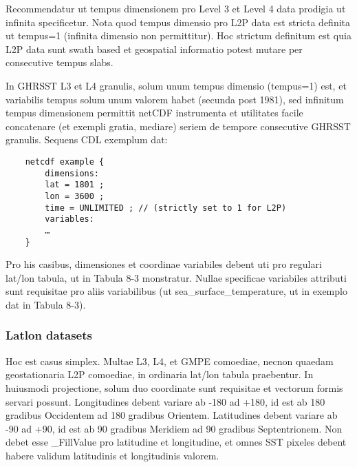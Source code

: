 Recommendatur ut tempus dimensionem pro Level 3 et Level 4 data prodigia ut infinita specificetur. Nota quod tempus dimensio pro L2P data est stricta definita ut tempus=1 (infinita dimensio non permittitur). Hoc strictum definitum est quia L2P data sunt swath based et geospatial informatio potest mutare per consecutive tempus slabs.
\par \vspace{0.1in}
In GHRSST L3 et L4 granulis, solum unum tempus dimensio (tempus=1) est, et variabilis tempus solum unum valorem habet (secunda post 1981), sed infinitum tempus dimensionem permittit netCDF instrumenta et utilitates facile concatenare (et exempli gratia, mediare) seriem de tempore consecutive GHRSST granulis. Sequens CDL exemplum dat:
\par \vspace{0.1in}

\begin{verbatim}
    netcdf example {
        dimensions:
        lat = 1801 ;
        lon = 3600 ;
        time = UNLIMITED ; // (strictly set to 1 for L2P)
        variables:
        …
    }
\end{verbatim}
\par \vspace{0.1in}
Pro his casibus, dimensiones et coordinae variabiles debent uti pro regulari lat/lon tabula, ut in Tabula 8-3 monstratur. Nullae specificae variabiles attributi sunt requisitae pro aliis variabilibus (ut sea\_surface\_temperature, ut in exemplo dat in Tabula 8-3).
\par \vspace{0.1in}



\subsubsection{Latlon datasets}
Hoc est casus simplex. Multae L3, L4, et GMPE comoediae, necnon quaedam geostationaria L2P comoediae, in ordinaria lat/lon tabula praebentur. In huiusmodi projectione, solum duo coordinate sunt requisitae et vectorum formis servari possunt. Longitudines debent variare ab -180 ad +180, id est ab 180 gradibus Occidentem ad 180 gradibus Orientem. Latitudines debent variare ab -90 ad +90, id est ab 90 gradibus Meridiem ad 90 gradibus Septentrionem. Non debet esse \_FillValue pro latitudine et longitudine, et omnes SST pixeles debent habere validum latitudinis et longitudinis valorem.
\par \vspace{0.1in}

